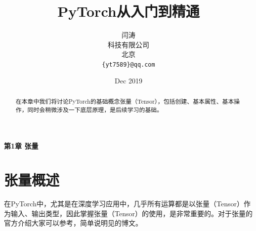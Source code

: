 \documentclass[UTF8]{article}
\title{PyTorch从入门到精通}
\author{
  闫涛 \\
  科技有限公司\\
  北京 \\
  \texttt{\{yt7589\}@qq.com} \\
}
\date{Dec 2019}
\begin{document}
\newpage
\maketitle
\begin{center}
\Large \textbf{第1章 张量} \quad 
\end{center}
\begin{abstract}
在本章中我们将讨论PyTorch的基础概念张量（Tensor），包括创建、基本属性、基本操作，同时会稍微涉及一下底层原理，是后续学习的基础。
\end{abstract}
\section{张量概述}
在PyTorch中，尤其是在深度学习应用中，几乎所有运算都是以张量（Tensor）作为输入、输出类型，因此掌握张量（Tensor）的使用，是非常重要的。对于张量的官方介绍大家可以参考\cite{pytorch-tensor-intro}，简单说明见\cite{csdn-blog-my-tensor1}的博文。
\end{document}

